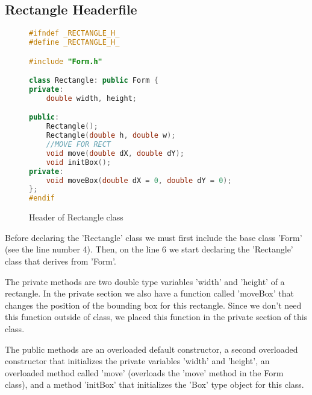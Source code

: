 \documentclass[a4paper, 10pt]{article}
\begin{document}
\subsection{Rectangle Headerfile}
\begin{figure}[H]
\begin{lstlisting}[language=c++]
#ifndef _RECTANGLE_H_
#define _RECTANGLE_H_

#include "Form.h"

class Rectangle: public Form {
private:
	double width, height;

public:
	Rectangle();
	Rectangle(double h, double w);
	//MOVE FOR RECT
	void move(double dX, double dY);
	void initBox();
private:
	void moveBox(double dX = 0, double dY = 0);
};
#endif
\end{lstlisting}
\caption{Header of Rectangle class}
\end{figure}
Before declaring the 'Rectangle' class we must first include the base class 'Form' (see the line number 4). Then, on the line 6 we start declaring the 'Rectangle' class that derives from 'Form'.

The private methods are two double type variables 'width' and 'height' of a rectangle. In the private section we also have a function called 'moveBox' that changes the position of the bounding box for this rectangle. Since we don't need this function outside of class, we placed this function in the private section of this class.

The public methods are an overloaded default constructor, a second overloaded constructor that initializes the private variables 'width' and 'height', an overloaded method called 'move' (overloads the 'move' method in the Form class), and a method 'initBox' that initializes the 'Box' type object for this class.
\end{document}
